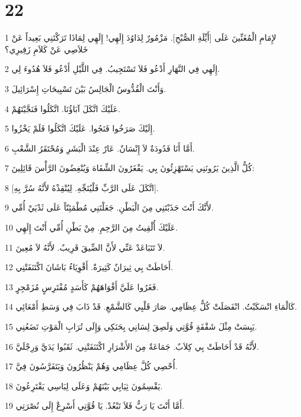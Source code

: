 \chapter{22}

\par 1 لإِمَامِ الْمُغَنِّينَ عَلَى [أَيِّلَةِ الصُّبْحِ]. مَزْمُورٌ لِدَاوُدَ إِلَهِي! إِلَهِي لِمَاذَا تَرَكْتَنِي بَعِيداً عَنْ خَلاَصِي عَنْ كَلاَمِ زَفِيرِي؟
\par 2 إِلَهِي فِي النَّهَارِ أَدْعُو فَلاَ تَسْتَجِيبُ. فِي اللَّيْلِ أَدْعُو فَلاَ هُدُوءَ لِي.
\par 3 وَأَنْتَ الْقُدُّوسُ الْجَالِسُ بَيْنَ تَسْبِيحَاتِ إِسْرَائِيلَ.
\par 4 عَلَيْكَ اتَّكَلَ آبَاؤُنَا. اتَّكَلُوا فَنَجَّيْتَهُمْ.
\par 5 إِلَيْكَ صَرَخُوا فَنَجُوا. عَلَيْكَ اتَّكَلُوا فَلَمْ يَخْزُوا.
\par 6 أَمَّا أَنَا فَدُودَةٌ لاَ إِنْسَانٌ. عَارٌ عِنْدَ الْبَشَرِ وَمُحْتَقَرُ الشَّعْبِ.
\par 7 كُلُّ الَّذِينَ يَرُونَنِي يَسْتَهْزِئُونَ بِي. يَفْغَرُونَ الشِّفَاهَ وَيُنْغِضُونَ الرَّأْسَ قَائِلِينَ:
\par 8 [اتَّكَلَ عَلَى الرَّبِّ فَلْيُنَجِّهِ. لِيُنْقِذْهُ لأَنَّهُ سُرَّ بِهِ].
\par 9 لأَنَّكَ أَنْتَ جَذَبْتَنِي مِنَ الْبَطْنِ. جَعَلْتَنِي مُطْمَئِنّاً عَلَى ثَدْيَيْ أُمِّي.
\par 10 عَلَيْكَ أُلْقِيتُ مِنَ الرَّحِمِ. مِنْ بَطْنِ أُمِّي أَنْتَ إِلَهِي.
\par 11 لاَ تَتَبَاعَدْ عَنِّي لأَنَّ الضِّيقَ قَرِيبٌ. لأَنَّهُ لاَ مُعِينَ.
\par 12 أَحَاطَتْ بِي ثِيرَانٌ كَثِيرَةٌ. أَقْوِيَاءُ بَاشَانَ اكْتَنَفَتْنِي.
\par 13 فَغَرُوا عَلَيَّ أَفْوَاهَهُمْ كَأَسَدٍ مُفْتَرِسٍ مُزَمْجِرٍ.
\par 14 كَالْمَاءِ انْسَكَبْتُ. انْفَصَلَتْ كُلُّ عِظَامِي. صَارَ قَلْبِي كَالشَّمْعِ. قَدْ ذَابَ فِي وَسَطِ أَمْعَائِي.
\par 15 يَبِسَتْ مِثْلَ شَقْفَةٍ قُوَّتِي وَلَصِقَ لِسَانِي بِحَنَكِي وَإِلَى تُرَابِ الْمَوْتِ تَضَعُنِي.
\par 16 لأَنَّهُ قَدْ أَحَاطَتْ بِي كِلاَبٌ. جَمَاعَةٌ مِنَ الأَشْرَارِ اكْتَنَفَتْنِي. ثَقَبُوا يَدَيَّ وَرِجْلَيَّ.
\par 17 أُحْصِي كُلَّ عِظَامِي وَهُمْ يَنْظُرُونَ وَيَتَفَرَّسُونَ فِيَّ.
\par 18 يَقْسِمُونَ ثِيَابِي بَيْنَهُمْ وَعَلَى لِبَاسِي يَقْتَرِعُونَ.
\par 19 أَمَّا أَنْتَ يَا رَبُّ فَلاَ تَبْعُدْ. يَا قُوَّتِي أَسْرِعْ إِلَى نُصْرَتِي.
